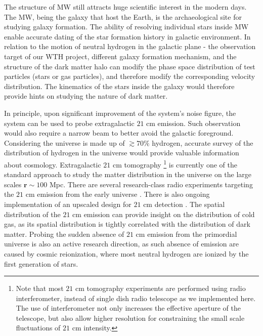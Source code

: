 \documentclass[12pt]{article}
\begin{document}
    The structure of MW still attracts huge scientific interest in the modern days. 
    The MW, being the galaxy that host the Earth, is the archaeological site for studying galaxy formation.
    The ability of resolving individual stars inside MW enable accurate dating of the star formation history in galactic environment.
    In relation to the motion of neutral hydrogen in the galactic plane - the observation target of our WTH project, different galaxy formation mechanism, and the structure of the dark matter halo can modify the phase space distribution of test particles (stars or gas particles), and therefore modify the corresponding velocity distribution.
    The kinematics of the stars inside the galaxy would therefore provide hints on studying the nature of dark matter. \cite{waveDM-compactibility-mw-satellite,wavedm-heating-dwarf,dynmaical-friction-in-waveDM-analytic,stellar-kinematics-waveDM,stellar-kinematics-dm-halo,stellar-streams-gaps-statistics-analytic}

    In principle, upon significant improvement of the system's noise figure, the system can be used to probe extragalactic $21$ cm emission.
    Such observation would also require a narrow beam to better avoid the galactic foreground.
    Considering the universe is made up of $\gtrsim 70 \%$ hydrogen, accurate survey of the distribution of hydrogen in the universe would provide valuable information about cosmology. 
    Extragalactic $21$ cm tomography 
    \footnote{Note that most $21$ cm tomography experiments are performed using radio interferometer, instead of single dish radio telescope as we implemented here. The use of interferometer not only increases the effective aperture of the telescope, but also allow higher resolution for constraining the small scale fluctuations of $21$ cm intensity.} 
    is currently one of the standard approach to study the matter distribution in the universe on the large scales $\mathbf{r} \sim 100$ Mpc. 
    There are several research-class radio experiments targeting the $21$ cm emission from the early universe \cite{chime-overview,chime-21cm-result}.
    There is also ongoing implementation of an upscaled design for $21$ cm detection \cite{chord-proposal}.
    The spatial distribution of the $21$ cm emission can provide insight on the distribution of cold gas, as its spatial distribution is tightly correlated with the distribution of dark matter. 
    Probing the sudden absence of $21$ cm emission from the primordial universe is also an active research direction, as such absence of emission are caused by cosmic reionization, where most neutral hydrogen are ionized by the first generation of stars. \cite{edge}
\end{document}
